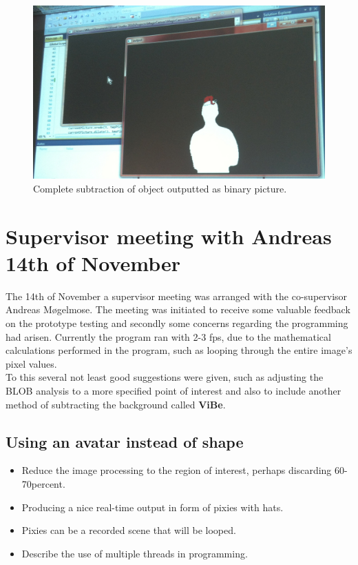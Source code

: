 \begin{figure}[htbp]
\centering
\includegraphics[width=1.00\textwidth]{Pictures/Test/MaxSubtracted.jpg}
\caption{Complete subtraction of object outputted as binary picture.}
\label{fig:max_subtracted}
\end{figure}


\section{Supervisor meeting with Andreas 14th of November}
The 14th of November a supervisor meeting was arranged with the co-supervisor Andreas Møgelmose. The meeting was initiated to receive some valuable feedback on the prototype testing and secondly some concerns regarding the programming had arisen. Currently the program ran with 2-3 fps, due to the mathematical calculations performed in the program, such as looping through the entire image's pixel values.\\
To this several not least good suggestions were given, such as adjusting the BLOB analysis to a more specified point of interest and also to include another method of subtracting the background called \textbf{ViBe}.

\subsection{Using an avatar instead of shape}
 \begin{itemize}
\item Reduce the image processing to the region of interest, perhaps discarding 60-70percent.
\item Producing a nice real-time output in form of pixies with hats.
\item Pixies can be a recorded scene that will be looped.
\item Describe the use of multiple threads in programming.
\end{itemize}
 
